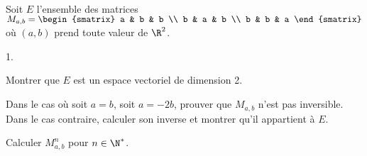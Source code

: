 \documentclass[11pt]{article}%
\begin{document}
\begin{exerciceSP}~\\
  Soit $E$ l'ensemble des matrices $M_{a,b} = 
  \begin{smatrix} 
    a & b & b \\ 
    b & a & b \\ 
    b & b & a 
  \end{smatrix}$ où $(a,b)$ prend toute valeur de $\R^2$.
  \begin{noliste}{1.}
    \setlength{\itemsep}{2mm}
  \item Montrer que $E$ est un espace vectoriel de dimension 2.
  \item Dans le cas où soit $a = b$, soit $a = -2b$, prouver que
    $M_{a,b}$ n'est pas inversible. \\
    Dans le cas contraire, calculer son inverse et montrer qu'il
    appartient à $E$.
  \item Calculer $M_{a,b}^n$ pour $n \in \N^*$.
  \end{noliste}
\end{exerciceSP}




\end{document}
